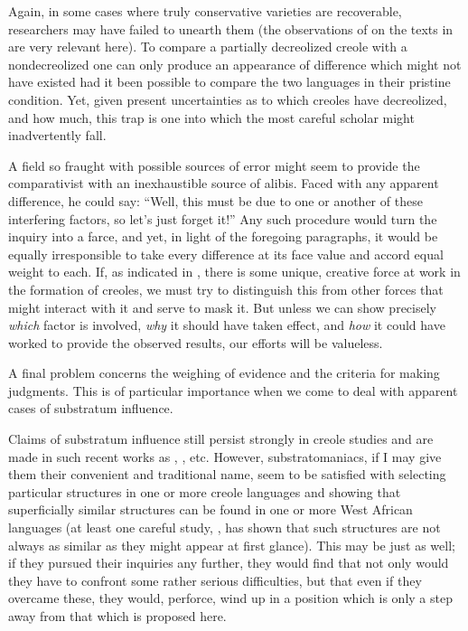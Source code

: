 Again, in some cases where truly conservative varieties are recoverable, researchers may have failed to unearth them (the obser\-vations of \citet{Bailey1971} on the texts in \citet{LePageEtAl1960} are very relevant here). To compare a partially decreolized creole with a nondecreolized one can only produce an appearance of difference which might not have existed had it been possible to compare the two languages in their pristine condition. Yet, given present uncertainties as to which creoles have decreolized, and how much, this trap is one into which the most careful scholar might inadvertently fall.

A field so fraught with possible sources of error might seem to provide the comparativist with an inexhaustible source of alibis. Faced with any apparent difference, he could say: ``Well, this must be due to one or another of these interfering factors, so let's just forget it!'' Any such procedure would turn the inquiry into a farce, and yet, in light of the foregoing paragraphs, it would be equally irresponsible to take every difference at its face value and accord equal weight to each. If, as indicated in , there is some unique, creative force at work in the formation of creoles, we must try to distinguish this from other forces that might interact with it and serve to mask it. But unless we can show precisely \textit{which} factor is involved, \textit{why} it should have taken effect, and \textit{how} it could have worked to provide the observed results, our efforts will be valueless.


A final problem concerns the weighing of evidence and the criteria for making judgments. This is of particular importance when we come\enlargethispage{1\baselineskip} to deal with apparent cases of substratum influence.

Claims of substratum influence still persist strongly in creole studies and are made in such recent works as \citet{JansenEtAl1978}, \citet{Alleyne1979, Alleyne1980}, etc. However, substrato\-maniacs, if I may give them their convenient and traditional name, seem to be satisfied with selecting particular structures in one or more creole languages and showing that superficially similar structures can be found in one or more West African languages (at least one careful study, \citealt{Huttar1975}, has shown that such structures are not always as similar as they might appear at first glance). This may be just as well; if they pursued their inquiries any further, they would find that not only would they have to confront some rather serious diffi\-culties, but that even if they overcame these, they would, perforce, wind up in a position which is only a step away from that which is proposed here.

